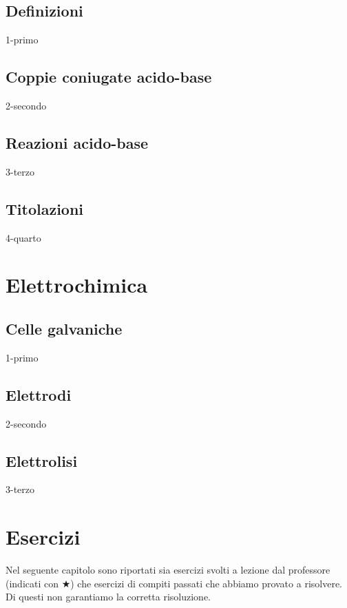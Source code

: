 \documentclass[openany,12pt]{book}%
\begin{document}
\section{Definizioni}
{1-primo}

\section{Coppie coniugate acido-base}
{2-secondo}

\section{Reazioni acido-base}
{3-terzo}

\section{Titolazioni}
{4-quarto}

\chapter{Elettrochimica}

\section{Celle galvaniche}
{1-primo}

\section{Elettrodi}
{2-secondo}

\section{Elettrolisi}
{3-terzo}

\appendix

\chapter{Esercizi}

Nel seguente capitolo sono riportati sia esercizi svolti a lezione dal professore (indicati con $\bigstar$) che esercizi di compiti passati che abbiamo provato a risolvere. Di questi non garantiamo la corretta risoluzione.
\end{document}
